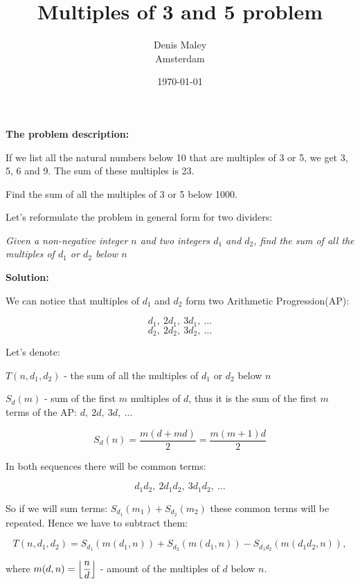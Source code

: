 \documentclass[12pt]{article}
\title{Multiples of 3 and 5 problem}
\author{
Denis Maley  \\
Amsterdam  \\
}
\date{\today}
\DeclarePairedDelimiter\floor{\lfloor}{\rfloor}
\begin{document}
\maketitle

\textbf{\large The problem description:}

\bigskip

If we list all the natural numbers below 10 that are multiples of 3 or 5, 
we get 3, 5, 6 and 9. The sum of these multiples is 23.

Find the sum of all the multiples of 3 or 5 below 1000.

\bigskip

Let's reformulate the problem in general form for two dividers:

\bigskip

\textit{
Given a non-negative integer $n$ and two integers $d_1$ and $d_2$, 
find the sum of all the multiples of $d_1$ or $d_2$ below $n$
}

\bigskip


\newpage

\textbf{\large Solution:}

\bigskip    



We can notice that multiples of $d_1$ and $d_2$ form two 
Arithmetic Progression(AP):

$$d_1, \> 2d_1, \> 3d_1, \> \ldots$$
$$d_2, \> 2d_2, \> 3d_2, \> \ldots$$

\bigskip

Let's denote: 

\bigskip

$T(n, d_1, d_2)$ - the sum of all the multiples of $d_1$ or $d_2$ below $n$

\bigskip

$S_{d}(m)$ - sum of the first $m$ multiples of $d$, thus it is the sum 
of the first $m$ terms of the AP: $d, \> 2d, \> 3d, \> \ldots$

$$ S_d(n) = \frac{m(d + md)}{2} = \frac{m(m + 1)d}{2}$$

\bigskip

In both sequences there will be common terms:

$$d_{1}d_{2}, \>  2d_{1}d_{2}, \> 3d_{1}d_{2}, \> \ldots$$


So if we will sum terms: $S_{d_1}(m_1) + S_{d_2}(m_2)$ these common terms 
will be repeated. Hence we have to subtract them: 

$$T(n, d_1, d_2) = S_{d_1}(m(d_1, n)) + S_{d_2}(m(d_1, n)) - 
S_{d_{1}d_{2}}(m(d_{1}d_{2}, n)), $$

\bigskip

where $m(d, n) = {\displaystyle \floor*{\frac{n}{d}}}$ - 
amount of the multiples of $d$ below $n$.



\bigskip
\end{document}
